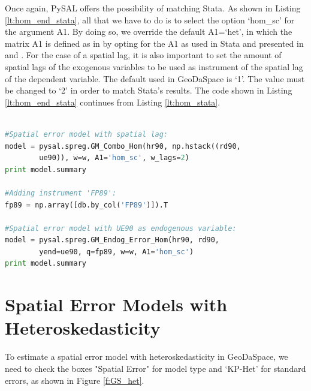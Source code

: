 \documentclass{article}
\begin{document}
Once again, PySAL offers the possibility of matching Stata. As shown in Listing \ref{lt:hom_end_stata}, all that we have to do is to select the option `hom\_sc' for the argument A1. By doing so, we override the default A1=`het', in which the matrix A1 is defined as in \citet{Arraiz10} by opting for the A1 as used in Stata and presented in \citet{Drukker10} and \citet{Drukker11}. For the case of a spatial lag, it is also important to set the amount of spatial lags of the exogenous variables to be used as instrument of the spatial lag of the dependent variable. The default used in GeoDaSpace is `1'. The value must be changed to `2' in order to match Stata's results. The code shown in Listing \ref{lt:hom_end_stata} continues from Listing \ref{lt:hom_stata}.

\begin{code}
\begin{lstlisting}[label=lt:hom_end_stata,caption=Using PySAL to match the results of spatial error models with endogenous variables or spatial lag from Stata,language=Python]

#Spatial error model with spatial lag:
model = pysal.spreg.GM_Combo_Hom(hr90, np.hstack((rd90,
        ue90)), w=w, A1='hom_sc', w_lags=2)
print model.summary

#Adding instrument 'FP89':
fp89 = np.array([db.by_col('FP89')]).T

#Spatial error model with UE90 as endogenous variable:
model = pysal.spreg.GM_Endog_Error_Hom(hr90, rd90,
        yend=ue90, q=fp89, w=w, A1='hom_sc')
print model.summary

\end{lstlisting}
\end{code}

\section{Spatial Error Models with Heteroskedasticity}
To estimate a spatial error model with heteroskedasticity in GeoDaSpace, we need to check the boxes "Spatial Error" for model type and `KP-Het' for standard errors, as shown in Figure \ref{f:GS_het}.
\end{document}
